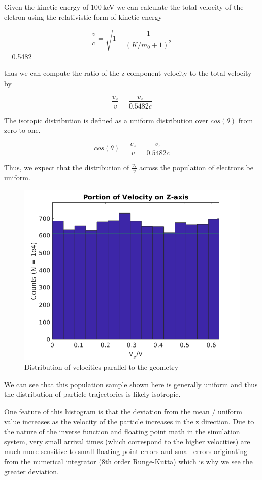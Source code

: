 \documentclass[12pt,letterpaper]{article}
\begin{document}
Given the kinetic energy of $100~$keV we can calculate the total velocity of the elctron using the relativistic form of kinetic energy

\[ \frac{v}{c} = \sqrt{1 - \frac{1}{(K/m_0 + 1)^2}} \] = 0.5482


thus we can compute the ratio of the z-component velocity to the total velocity by

\[ \frac{v_z}{v} = \frac{v_z}{0.5482c} \]

The isotopic distribution is defined as a uniform distribution over $cos(\theta)$ from zero to one.

\[ cos(\theta) = \frac{v_z}{v} = \frac{v_z}{0.5482c} \]

Thus, we expect that the distribution of $\frac{v_z}{v}$ across the population of electrons be uniform.

    \begin{figure}[H]
    \centering
    \includegraphics[width=0.7\linewidth]{img/arrival.png}
    \caption{Distribution of velocities parallel to the geometry}
    \end{figure}
    
We can see that this population sample shown here is generally uniform and thus the distribution of particle trajectories is likely isotropic. 

One feature of this histogram is that the deviation from the mean / uniform value increases as the velocity of the particle increases in the z direction. Due to the nature of the inverse function and floating point math in the simulation system, very small arrival times (which correspond to the higher velocities) are much more sensitive to small floating point errors and small errors originating from the numerical integrator (8th order Runge-Kutta) which is why we see the greater deviation. 
\end{document}
